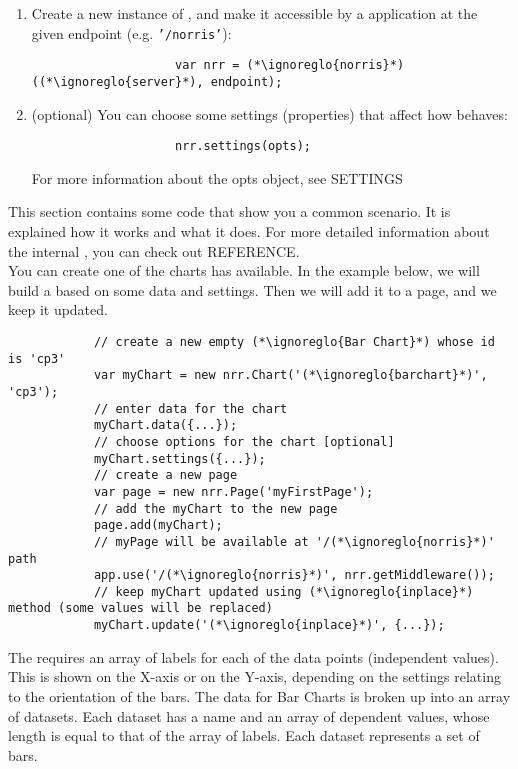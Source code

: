 \begin{itemize}
\begin{enumerate}
				\begin{lstlisting}
					var (*\ignoreglo{norris}*) = require('(*\ignoreglo{norris}*)');
				\end{lstlisting}
				\item Create a new instance of , and make it accessible by a  application at the given endpoint (e.g. \texttt{'/norris'}):
				\begin{lstlisting}
					var nrr = (*\ignoreglo{norris}*)((*\ignoreglo{server}*), endpoint);
				\end{lstlisting}
				\item (optional) You can choose some settings (properties) that affect how  behaves:
				\begin{lstlisting}
					nrr.settings(opts);
				\end{lstlisting}
				For more information about the opts object, see  SETTINGS
			\end{enumerate}
		\end{itemize}
		This section contains some code that show you a common scenario. It is explained how it works and what it does. For more detailed information about the internal , you can check out  REFERENCE.\\
		You can create one of the charts  has available. In the example below, we will build a  based on some data and settings. Then we will add it to a page, and we keep it updated.
		\begin{lstlisting}
			// create a new empty (*\ignoreglo{Bar Chart}*) whose id is 'cp3'
			var myChart = new nrr.Chart('(*\ignoreglo{barchart}*)', 'cp3');
			// enter data for the chart
			myChart.data({...});
			// choose options for the chart [optional]
			myChart.settings({...});
			// create a new page
			var page = new nrr.Page('myFirstPage');
			// add the myChart to the new page
			page.add(myChart);
			// myPage will be available at '/(*\ignoreglo{norris}*)' path
			app.use('/(*\ignoreglo{norris}*)', nrr.getMiddleware());
			// keep myChart updated using (*\ignoreglo{inplace}*) method (some values will be replaced)
			myChart.update('(*\ignoreglo{inplace}*)', {...});
		\end{lstlisting}
			The  requires an array of labels for each of the data points (independent values). This is shown on the X-axis or on the Y-axis, depending on the settings relating to the orientation of the bars. The data for Bar Charts is broken up into an array of datasets. Each dataset has a name and an array of dependent values, whose length is equal to that of the array of labels. Each dataset represents a set of bars.\\
